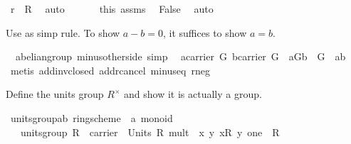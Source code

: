 \begin{isabellebody}
\ {\isachardoublequoteopen}r\ {\isacharequal}\ {\isasymzero}\isactrlbsub R\isactrlesub {\isachardoublequoteclose}\ \isamarkupfalse%
\ auto\isanewline
\ \ \isacommand{{\isacharbraceright}}\isamarkupfalse%
\isanewline
\ \ \isamarkupfalse%
\ this\ assms\ \isamarkupfalse%
\ False\ \isamarkupfalse%
\ auto\isanewline
{}\isamarkupfalse%
%
\endisatagproof
{\isafoldproof}%
%
\isadelimproof
%
\endisadelimproof
%
\begin{isamarkuptext}%
Use as simp rule. To show $a-b=0$, it suffices to show $a=b$.%
\end{isamarkuptext}%
\isamarkuptrue%
\isamarkupfalse%
\ {\isacharparenleft}\ abelian{\isacharunderscore}group{\isacharparenright}\ minus{\isacharunderscore}other{\isacharunderscore}side\ {\isacharbrackleft}simp{\isacharbrackright}{\isacharcolon}\isanewline
\ \ {\isachardoublequoteopen}{\isasymlbrakk}a{\isasymin}carrier\ G{\isacharsemicolon}\ b{\isasymin}carrier\ G{\isasymrbrakk}\ {\isasymLongrightarrow}\ {\isacharparenleft}a{\isasymominus}\isactrlbsub G\isactrlesub b\ {\isacharequal}\ {\isasymzero}\isactrlbsub G\isactrlesub {\isacharparenright}\ {\isacharequal}\ {\isacharparenleft}a{\isacharequal}b{\isacharparenright}{\isachardoublequoteclose}\isanewline
%
\isadelimproof
%
\endisadelimproof
%
\isatagproof
{}\isamarkupfalse%
\ {\isacharparenleft}metis\ add{\isachardot}inv{\isacharunderscore}closed\ add{\isachardot}r{\isacharunderscore}cancel\ minus{\isacharunderscore}eq\ r{\isacharunderscore}neg{\isacharparenright}%
\endisatagproof
{\isafoldproof}%
%
\isadelimproof
%
\endisadelimproof
%
\isamarkuptrue%
%
\begin{isamarkuptext}%
Define the units group $R^{\times}$ and show it is actually a group.%
\end{isamarkuptext}%
\isamarkuptrue%
\isamarkupfalse%
\ units{\isacharunderscore}group{\isacharcolon}{\isacharcolon}{\isachardoublequoteopen}{\isacharparenleft}{\isacharprime}a{\isacharcomma}{\isacharprime}b{\isacharparenright}\ ring{\isacharunderscore}scheme\ {\isasymRightarrow}\ {\isacharprime}a\ monoid{\isachardoublequoteclose}\isanewline
\ \ \ {\isachardoublequoteopen}units{\isacharunderscore}group\ R\ {\isacharequal}\ {\isasymlparr}carrier\ {\isacharequal}\ Units\ R{\isacharcomma}\ mult\ {\isacharequal}\ {\isacharparenleft}{\isasymlambda}x\ y{\isachardot}\ x{\isasymotimes}\isactrlbsub R\isactrlesub \ y{\isacharparenright}{\isacharcomma}\ one\ {\isacharequal}\ {\isasymone}\isactrlbsub R\isactrlesub {\isasymrparr}{\isachardoublequoteclose}%

\end{isabellebody}
